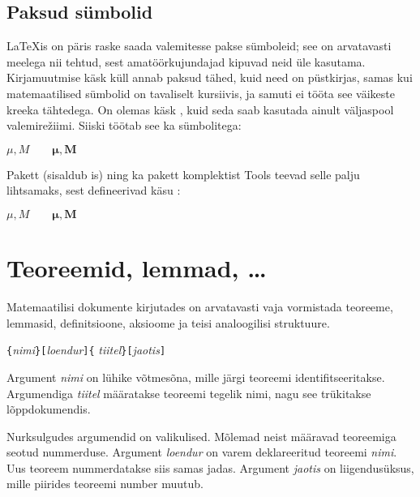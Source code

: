 
\subsection{Paksud sümbolid}

\LaTeX is on päris raske saada valemitesse pakse sümboleid; see on
arvatavasti meelega nii tehtud, sest amatöörkujundajad kipuvad neid üle
kasutama. Kirjamuutmise käsk  küll annab paksud tähed,
kuid need on püstkirjas, samas kui matemaatilised sümbolid on tavaliselt
kursiivis, ja samuti ei tööta see väikeste kreeka tähtedega. On olemas
käsk , kuid seda saab kasutada ainult väljaspool
valemire\v{z}iimi. Siiski töötab see ka sümbolitega:
\begin{example}
$\mu, M \qquad
\mathbf{\mu}, \mathbf{M}$
\qquad {}
\end{example}

Pakett  (sisaldub is) ning ka pakett 
komplektist Tools teevad selle palju lihtsamaks, sest defineerivad käsu
:
\begin{example}
$\mu, M \qquad
\boldsymbol{\mu}, \boldsymbol{M}$
\end{example}

\section{Teoreemid, lemmad, \ldots}

Matemaatilisi dokumente kirjutades on arvatavasti vaja vormistada
teoreeme, lemmasid, definitsioone, aksioome ja teisi analoogilisi
struktuure.
\begin{lscommand}
\verb|{|\emph{nimi}\verb|}[|\emph{loendur}\verb|]{|%
         \emph{tiitel}\verb|}[|\emph{jaotis}\verb|]|
\end{lscommand}
\noindent Argument \emph{nimi} on lühike võtmesõna, mille järgi
teoreemi identifitseeritakse. Argumendiga \emph{tiitel} määratakse
teoreemi tegelik nimi, nagu see trükitakse lõppdokumendis.

Nurksulgudes argumendid on valikulised. Mõlemad neist määravad
teoreemiga seotud nummerduse. Argument \emph{loendur} on varem
deklareeritud teoreemi \emph{nimi}. Uus teoreem nummerdatakse
siis samas jadas. Argument \emph{jaotis} on liigendusüksus, mille
piirides teoreemi number muutub.\pagebreak[3]

